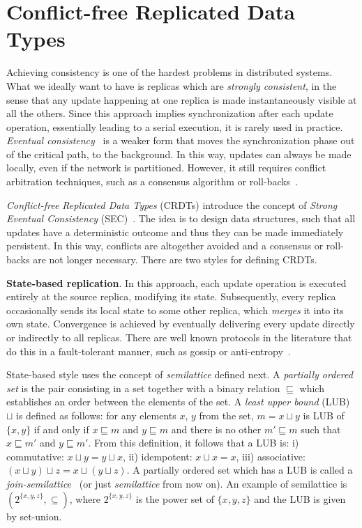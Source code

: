 \section{Conflict-free Replicated Data Types}
\label{sec:crdts}

Achieving consistency is one of the hardest problems in distributed
systems. What we ideally want to have is replicas which are \textit{strongly
consistent}, in the sense that any update happening at one replica is made
instantaneously visible at all the others. Since this approach implies
synchronization after each update operation, essentially leading to a serial
execution, it is rarely used in practice. \textit{Eventual
consistency}~\cite{DBLP:journals/queue/Vogels08a,Saito:2005:OR:1057977.1057980}
is a weaker form that moves the synchronization phase out of the critical path,
to the background. In this way, updates can always be made locally, even if the
network is partitioned. However, it still requires conflict arbitration
techniques, such as a consensus algorithm or
roll-backs~\cite{Terry:1995:MUC:224056.224070}.

\textit{Conflict-free Replicated Data Types} (CRDTs) introduce the concept of
\textit{Strong Eventual Consistency}
(SEC)~\cite{Shapiro:2011:CRD:2050613.2050642}. The idea is to design data
structures, such that all updates have a deterministic outcome and thus they can
be made immediately persistent. In this way, conflicts are altogether avoided
and a consensus or roll-backs are not longer necessary. There are two
styles for defining CRDTs.

\textbf{State-based replication}. In this approach, each update operation is
executed entirely at the source replica, modifying its state. Subsequently,
every replica occasionally sends its local state to some other replica, which
\textit{merges} it into its own state. Convergence is achieved by eventually
delivering every update directly or indirectly to all replicas. There are well
known protocols in the literature that do this in a fault-tolerant manner, such
as gossip or anti-entropy~\cite{Demers:1987:EAR:41840.41841,
Petersen:1997:FUP:268998.266711}.

State-based style uses the concept of \textit{semilattice} defined next. A
\textit{partially ordered set} is the pair consisting in a set together with a
binary relation $\sqsubseteq$ which establishes an order between the elements of
the set. A \textit{least upper bound} (LUB) $\sqcup$ is defined as follows: for
any elements $x$, $y$ from the set, $m = x \sqcup y$ is LUB of $\{x, y\}$ if and
only if $x \sqsubseteq m$ and $y \sqsubseteq m$ and there is no other $m'
\sqsubseteq m$ such that $x \sqsubseteq m'$ and $y \sqsubseteq m'$. From this
definition, it follows that a LUB is: i) commutative: $x \sqcup y = y \sqcup x$,
ii) idempotent: $x \sqcup x = x$, iii) associative: $(x \sqcup y) \sqcup z = x
\sqcup (y \sqcup z)$. A partially ordered set which has a LUB is called a
\textit{join-semilattice}~\cite{semilattice} (or just \textit{semilattice} from
now on). An example of semilattice is $(2^{\{x, y, z\}}, \subseteq)$, where
$2^{\{x, y, z\}}$ is the power set of $\{x, y, z\}$ and the LUB is given by
set-union.

